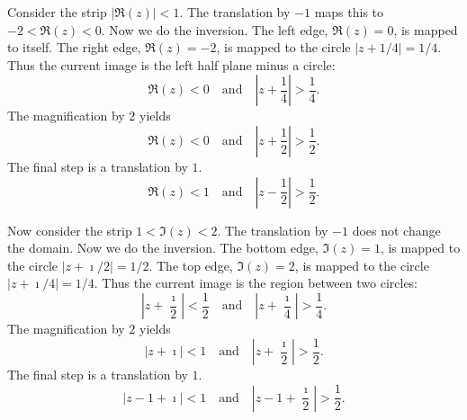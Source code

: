 {\begin{Solution}
\begin{enumerate}
    Consider the strip $|\Re(z)| < 1$.  The translation by $-1$ maps
    this to $-2 < \Re(z) < 0$.  Now we do the inversion.  The left
    edge, $\Re(z) = 0$, is mapped to itself.  The right edge, $\Re(z) =
    -2$, is mapped to the circle $|z + 1/4| = 1/4$.  Thus the current
    image is the left half plane minus a circle:
    \[
    \Re(z) < 0 \quad \mathrm{and} \quad 
    \left| z + \frac{1}{4} \right| > \frac{1}{4}.
    \]
    The magnification by $2$ yields
    \[
    \Re(z) < 0 \quad \mathrm{and} \quad 
    \left| z + \frac{1}{2} \right| > \frac{1}{2}.
    \]
    The final step is a translation by $1$.
    \[
    \boxed{
      \Re(z) < 1 \quad \mathrm{and} \quad 
      \left| z - \frac{1}{2} \right| > \frac{1}{2}.
      }
    \]

    Now consider the strip $1 < \Im(z) < 2$.
    The translation by $-1$ does not change the domain.
    Now we do the inversion.  The bottom edge, $\Im(z) = 1$,
    is mapped to the circle $|z + \imath / 2| = 1/2$.  The top edge, 
    $\Im(z) = 2$, is mapped to the circle $|z + \imath / 4| = 1/4$.  
    Thus the current image is the region between two circles:
    \[
    \left| z + \frac{\imath}{2} \right| < \frac{1}{2} \quad \mathrm{and} \quad
    \left| z + \frac{\imath}{4} \right| > \frac{1}{4}.
    \]
    The magnification by $2$ yields
    \[
    \left| z + \imath \right| < 1 \quad \mathrm{and} \quad
    \left| z + \frac{\imath}{2} \right| > \frac{1}{2}.
    \]
    The final step is a translation by $1$.
    \[
    \boxed{
      \left| z - 1 + \imath \right| < 1 \quad \mathrm{and} \quad
      \left| z - 1 + \frac{\imath}{2} \right| > \frac{1}{2}.
      }
    \]
  \end{enumerate}
\end{Solution}
}







